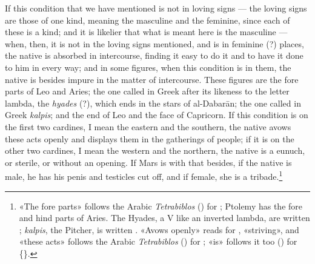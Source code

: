 \documentclass[11pt]{article}
\newcommand{\Fol}[1]{\marginpar{\footnotesize\color{gray}f.\,#1}}
\begin{document}
\par \Fol{69v}If this condition that we have mentioned is not in loving signs — the loving signs are those of one kind, meaning the masculine and the feminine, since each of these is a kind; and it is likelier that what is meant here is the masculine — when, then, it is not in the loving signs mentioned, and is in feminine (?) places, the native is absorbed in intercourse, finding it easy to do it and to have it done to him in every way; and in some figures, when this condition is in them, the native is besides impure in the matter of intercourse. These figures are the fore parts of Leo and Aries; the one called in Greek after its likeness to the letter lambda, the \emph{hyades} (?), which ends in the stars of al-Dabarān; the one called in Greek \emph{kalpis}; and the end of Leo and the face of Capricorn. If this condition is on the first two cardines, I mean the eastern and the southern, the native avows these acts openly and displays them in the gatherings of people; if it is on the other two cardines, I mean the western and the northern, the native is a eunuch, or sterile, or without an opening. If Mars is with that besides, if the native is male, he has his penis and testicles cut off, and if female, she is a tribade.\footnote{«The fore parts» follows the Arabic \emph{Tetrabiblos} () for ; Ptolemy has the fore and hind parts of Aries. The Hyades, a V like an inverted lambda, are written ; \emph{kalpis}, the Pitcher, is written . «Avows openly» reads  for , «striving», and «these acts» follows the Arabic \emph{Tetrabiblos} () for ; «is» follows it too () for \{\}.}\par
\end{document}
